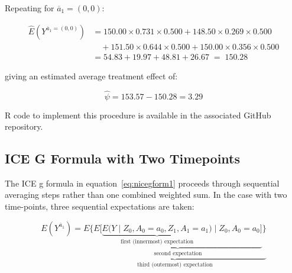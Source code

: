 \documentclass[12pt]{article}
\numberwithin{equation}{section}
\begin{document}
Repeating for $\overline{a}_1 = (0,0)$:

\begin{align*}
\hat{E}(Y^{\overline{a}_1=(0,0)})
  &= 150.00 \times 0.731 \times 0.500
   + 148.50 \times 0.269 \times 0.500 \\
  &\quad + 151.50 \times 0.644 \times 0.500
   + 150.00 \times 0.356 \times 0.500 \\
  &= 54.83 + 19.97 + 48.81 + 26.67 \;=\; 150.28
\end{align*}

\noindent giving an estimated average treatment effect of:

\begin{equation}
\hat{\psi} = 153.57 - 150.28 = 3.29
\end{equation}

R code to implement this procedure is available in the associated GitHub repository.

 
\subsection{ICE G Formula with Two Timepoints}

The ICE g formula in equation~\eqref{eq:nicegform1} proceeds through sequential averaging steps rather than one combined weighted sum. In the case with two time-points, three sequential expectations are taken: 

\begin{equation}
E(Y^{\overline{a}_1}) = \underbrace{E \bigg \{ \underbrace{E \bigg [ \underbrace{E \big (Y \mid Z_0, A_0 = a_0, Z_1, A_1 = a_1 \big )}_{\text{first (innermost) expectation}} \mid Z_0, A_0 = a_0 \bigg ]}_{\text{second expectation}} \bigg \}}_{\text{third (outermost) expectation}}
\end{equation}
\end{document}
